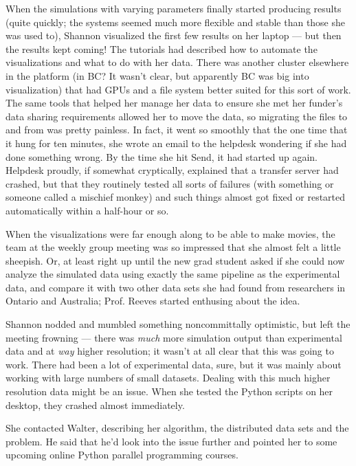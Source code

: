 \documentclass[11pt, letterpaper, twoside]{article}
\begin{document}
\begin{tcolorbox}[enhanced,breakable,colback=gray!15,colframe=cdaRed,parbox=false]
When the simulations with varying parameters finally started producing
results (quite quickly; the systems seemed much more flexible and stable
than those she was used to), Shannon visualized the first few results on
her laptop --- but then the results kept coming!  The tutorials had
described how to automate the visualizations and what to do with her
data. There was another cluster elsewhere in the platform (in BC? It
wasn't clear, but apparently BC was big into visualization) that had
GPUs and a file system better suited for this sort of work. The same
tools that helped her manage her data to ensure she met her funder's
data sharing requirements allowed her to move the data, so migrating the
files to and from was pretty painless. In fact, it went so smoothly that
the one time that it hung for ten minutes, she wrote an email to the
helpdesk wondering if she had done something wrong. By the time she hit
Send, it had started up again.  Helpdesk proudly, if somewhat
cryptically, explained that a transfer server had crashed, but that they
routinely tested all sorts of failures (with something or someone called
a mischief monkey) and such things almost got fixed or restarted
automatically within a half-hour or so.

When the visualizations were far enough along to be able to make movies,
the team at the weekly group meeting was so impressed that she almost
felt a little sheepish. Or, at least right up until the new grad student
asked if she could now analyze the simulated data using exactly the same
pipeline as the experimental data, and compare it with two other data
sets she had found from researchers in Ontario and Australia; Prof.
Reeves started enthusing about the idea.

Shannon nodded and mumbled something noncommittally optimistic, but left
the meeting frowning --- there was \textit{much} more simulation output
than experimental data and at \textit{way} higher resolution; it wasn't
at all clear that this was going to work. There had been a lot of
experimental data, sure, but it was mainly about working with large
numbers of small datasets. Dealing with this much higher resolution data
might be an issue. When she tested the Python scripts on her desktop,
they crashed almost immediately.

She contacted Walter, describing her algorithm, the distributed data
sets and the problem. He said that he'd look into the issue further and
pointed her to some upcoming online Python parallel programming courses.


\end{tcolorbox}
\end{document}
